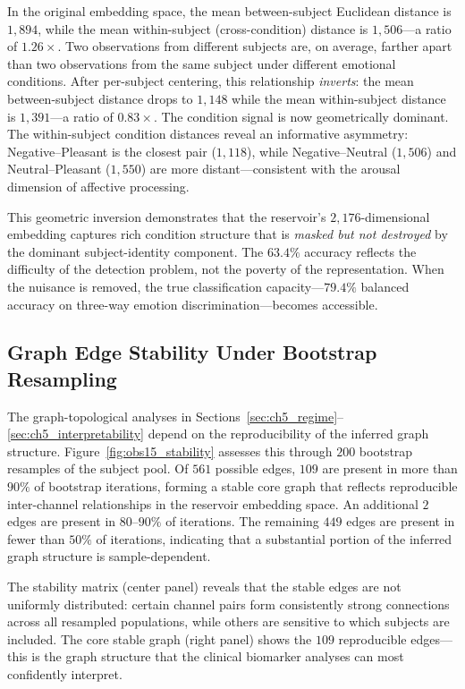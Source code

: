 In the original embedding space, the mean between-subject Euclidean distance is $1{,}894$, while the mean within-subject (cross-condition) distance is $1{,}506$---a ratio of $1.26\times$. Two observations from different subjects are, on average, farther apart than two observations from the same subject under different emotional conditions. After per-subject centering, this relationship \emph{inverts}: the mean between-subject distance drops to $1{,}148$ while the mean within-subject distance is $1{,}391$---a ratio of $0.83\times$. The condition signal is now geometrically dominant. The within-subject condition distances reveal an informative asymmetry: Negative--Pleasant is the closest pair ($1{,}118$), while Negative--Neutral ($1{,}506$) and Neutral--Pleasant ($1{,}550$) are more distant---consistent with the arousal dimension of affective processing.

This geometric inversion demonstrates that the reservoir's $2{,}176$-dimensional embedding captures rich condition structure that is \emph{masked but not destroyed} by the dominant subject-identity component. The $63.4\%$ accuracy reflects the difficulty of the detection problem, not the poverty of the representation. When the nuisance is removed, the true classification capacity---$79.4\%$ balanced accuracy on three-way emotion discrimination---becomes accessible.

\subsection{Graph Edge Stability Under Bootstrap Resampling}

The graph-topological analyses in Sections~\ref{sec:ch5_regime}--\ref{sec:ch5_interpretability} depend on the reproducibility of the inferred graph structure. Figure~\ref{fig:obs15_stability} assesses this through $200$ bootstrap resamples of the subject pool. Of $561$ possible edges, $109$ are present in more than $90\%$ of bootstrap iterations, forming a stable core graph that reflects reproducible inter-channel relationships in the reservoir embedding space. An additional $2$ edges are present in $80$--$90\%$ of iterations. The remaining $449$ edges are present in fewer than $50\%$ of iterations, indicating that a substantial portion of the inferred graph structure is sample-dependent.

The stability matrix (center panel) reveals that the stable edges are not uniformly distributed: certain channel pairs form consistently strong connections across all resampled populations, while others are sensitive to which subjects are included. The core stable graph (right panel) shows the $109$ reproducible edges---this is the graph structure that the clinical biomarker analyses can most confidently interpret.

